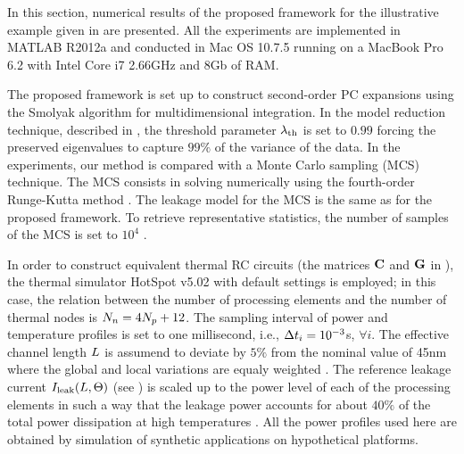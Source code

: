 In this section, numerical results of the proposed framework for the illustrative example given in  are presented. All the experiments are implemented in MATLAB R2012a \cite{matlab} and conducted in Mac OS 10.7.5 running on a MacBook Pro 6.2 with Intel Core i7 2.66GHz and 8Gb of RAM.

The proposed framework is set up to construct second-order PC expansions using the Smolyak algorithm for multidimensional integration. In the model reduction technique, described in , the threshold parameter $\lambda_\text{th}$ is set to $0.99$ forcing the preserved eigenvalues to capture $99\%$ of the variance of the data. In the experiments, our method is compared with a Monte Carlo sampling (MCS) technique. The MCS consists in solving  numerically using the fourth-order Runge-Kutta method \cite{press2007}. The leakage model for the MCS is the same as for the proposed framework. To retrieve representative statistics, the number of samples of the MCS is set to $10^4$ \cite{xiu2009}.

In order to construct equivalent thermal RC circuits (the matrices $\mC$ and $\mG$ in ), the thermal simulator HotSpot v5.02 \cite{hotspot} with default settings is employed; in this case, the relation between the number of processing elements and the number of thermal nodes is ${N_n} = 4 {N_p} + 12$. The sampling interval of power and temperature profiles is set to one millisecond, i.e., $\Delta t_i = 10^{-3}$s, $\forall i$. The effective channel length $L$ is assumend to deviate by $5\%$ from the nominal value of 45nm where the global and local variations are equaly weighted \cite{juan2012}. The reference leakage current $I_{\text{leak}}(L, \Theta)$ (see ) is scaled up to the power level of each of the processing elements in such a way that the leakage power accounts for about $40\%$ of the total power dissipation at high temperatures \cite{liu2007}. All the power profiles used here are obtained by simulation of synthetic applications on hypothetical platforms.

